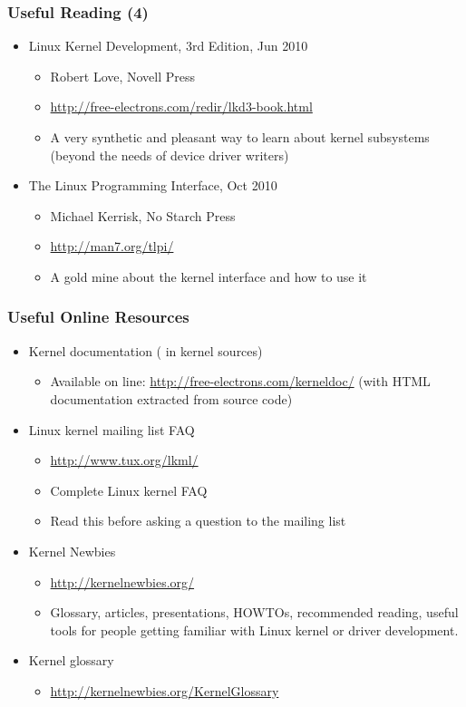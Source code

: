 \begin{frame}
  \frametitle{Useful Reading (4)}
  \begin{itemize}
  \item Linux Kernel Development, 3rd Edition, Jun 2010
    \begin{itemize}
    \item Robert Love, Novell Press
    \item \url{http://free-electrons.com/redir/lkd3-book.html}
    \item A very synthetic and pleasant way to learn about kernel
      subsystems (beyond the needs of device driver writers)
    \end{itemize}
  \item The Linux Programming Interface, Oct 2010
    \begin{itemize}
    \item Michael Kerrisk, No Starch Press
    \item \url{http://man7.org/tlpi/}
    \item A gold mine about the kernel interface and how to use it
    \end{itemize}
  \end{itemize}
\end{frame}

\begin{frame}
  \frametitle{Useful Online Resources}
  \begin{itemize}
  \item Kernel documentation ( in kernel sources)
    \begin{itemize}
    \item Available on line:
      \url{http://free-electrons.com/kerneldoc/} (with HTML
      documentation extracted from source code)
    \end{itemize}
  \item Linux kernel mailing list FAQ
    \begin{itemize}
    \item \url{http://www.tux.org/lkml/}
    \item Complete Linux kernel FAQ
    \item Read this before asking a question to the mailing list
    \end{itemize}
  \item Kernel Newbies
    \begin{itemize}
    \item \url{http://kernelnewbies.org/}
    \item Glossary, articles, presentations, HOWTOs, recommended
      reading, useful tools for people getting familiar with Linux
      kernel or driver development.
    \end{itemize}
  \item Kernel glossary
    \begin{itemize}
    \item \url{http://kernelnewbies.org/KernelGlossary}
    \end{itemize}
\end{itemize}

\end{frame}


